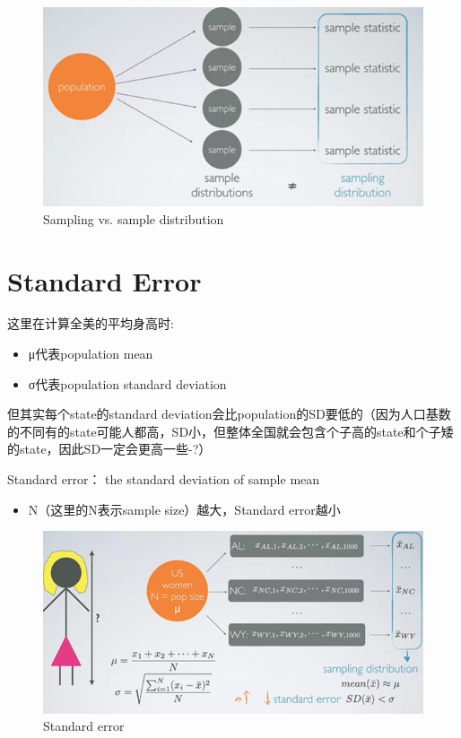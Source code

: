 \documentclass[]{book}
\providecommand{\tightlist}{%
  \setlength{\itemsep}{0pt}\setlength{\parskip}{0pt}}
\begin{document}
\begin{figure}

{\centering \includegraphics[width=0.8\linewidth]{graphs/1-3} 

}

\caption{Sampling vs. sample distribution}\label{fig:fig3}
\end{figure}

\section{Standard Error}\label{standard-error}

这里在计算全美的平均身高时:

\begin{itemize}
\tightlist
\item
  μ代表population mean
\item
  σ代表population standard deviation
\end{itemize}

但其实每个state的standard
deviation会比population的SD要低的（因为人口基数的不同有的state可能人都高，SD小，但整体全国就会包含个子高的state和个子矮的state，因此SD一定会更高一些-?）

Standard error： the standard deviation of sample mean

\begin{itemize}
\tightlist
\item
  N（这里的N表示sample size）越大，Standard error越小
\end{itemize}

\begin{figure}

{\centering \includegraphics[width=0.8\linewidth]{graphs/1-4} 

}

\caption{Standard error}\label{fig:fig4}
\end{figure}
\end{document}
